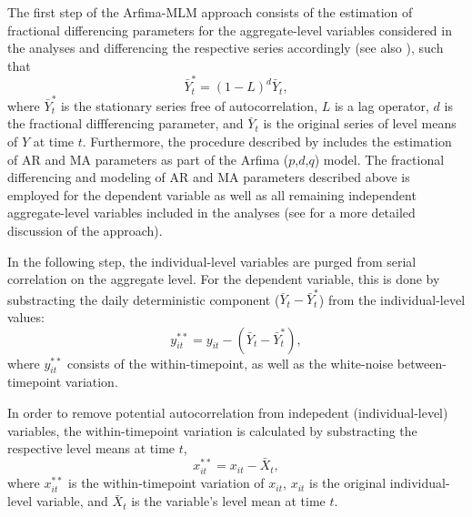 \documentclass[12pt]{paper}\usepackage[]{graphicx}\usepackage[]{color}
\begin{document}
The first step of the Arfima-MLM approach consists of the estimation of fractional differencing parameters for the aggregate-level variables considered in the analyses and differencing the respective series accordingly (see also \citealt{box1996dynamics}), such that
\begin{equation}
\bar{Y}^*_t=(1-L)^d\bar{Y}_t,
\end{equation}
where $\bar{Y}^*_t$ is the stationary series free of autocorrelation, $L$ is a lag operator, $d$ is the fractional diffferencing parameter, and $\bar{Y}_t$ is the original series of level means of $Y$ at time $t$. Furthermore, the procedure described by \citet{lebo2015effective} includes the estimation of AR and MA parameters as part of the Arfima ($p$,$d$,$q$) model. The fractional differencing and modeling of AR and MA parameters described above is employed for the dependent variable as well as all remaining independent aggregate-level variables included in the analyses (see \citealt{lebo2015effective} for a more detailed discussion of the approach).

In the following step, the individual-level variables are purged from serial correlation on the aggregate level. For the dependent variable, this is done by substracting the daily deterministic component ($\bar{Y}_t-\bar{Y}^*_t$) from the individual-level values:
\begin{equation}
y_{it}^{**}=y_{it}-(\bar{Y}_t-\bar{Y}^*_t),\label{eq:ydif}
\end{equation}
where $y_{it}^{**}$ consists of the within-timepoint, as well as the white-noise between-timepoint variation.

In order to remove potential autocorrelation from indepedent (individual-level) variables, the within-timepoint variation is calculated by substracting the respective level means at time $t$,
\begin{equation}
x_{it}^{**}=x_{it}-\bar{X}_t,\label{eq:xdif}
\end{equation}
where $x_{it}^{**}$ is the within-timepoint variation of $x_{it}$, $x_{it}$ is the original individual-level variable, and $\bar{X}_t$ is the variable's level mean at time $t$.
\end{document}
